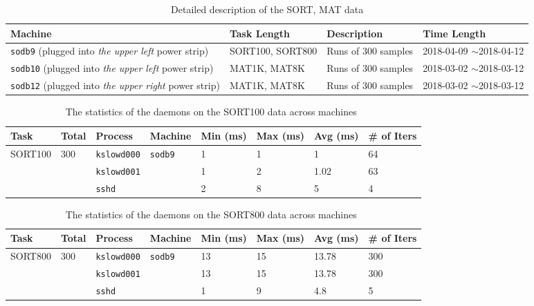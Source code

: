 \documentclass[10pt]{article}
\begin{document}
\begin{table}[h]
\begin{center}
\begin{tabular}{|p{4cm}|p{4cm}|p{4cm}|p{4cm}|} \hline
Machine & Task Length & Description & Time Length\\ \hline
{\tt sodb9}  (plugged into {\em the upper left} power strip) & SORT100, SORT800 & Runs of 300 samples & 2018-04-09 $\sim$2018-04-12\\ \hline
{\tt sodb10} (plugged into {\em the upper left} power strip)  & MAT1K, MAT8K & Runs of 300 samples & 2018-03-02 $\sim$2018-03-12 \\ \hline
{\tt sodb12} (plugged into {\em the upper right} power strip) & MAT1K, MAT8K & Runs of 300 samples & 2018-03-02 $\sim$2018-03-12 \\ \hline
\end{tabular}
\end{center}
\vspace{-.2in}
\caption{Detailed description of the SORT, MAT data\label{tab:exp_notes_sort_mat}}
\end{table}

\begin{table}[htp!]
\centering
{\small
 \begin{tabular}{|l|l|l|l|l||l|l|l|} \hline
 Task & Total & Process & Machine & Min (ms) & Max (ms) & Avg (ms) & \# of Iters\\ \hline
 SORT100 & 300 & {\tt kslowd000}  & {\tt sodb9} & 1 & 1 & 1 & 64 \\ \hline
  &  & {\tt kslowd001}  & 	& 1 & 2 & 1.02 & 63  \\ \hline
  &  & {\tt sshd}  & & 2 & 8 & 5 & 4 \\ \hline
 \end{tabular}
  }
 \caption{The statistics of the daemons on the SORT100 data across machines~\label{tab:sort100}}
\end{table}

\begin{table}[htp!]
\centering
{\small
 \begin{tabular}{|l|l|l|l|l||l|l|l|} \hline
 Task & Total & Process & Machine & Min (ms) & Max (ms) & Avg (ms) & \# of Iters\\ \hline
 SORT800 & 300 & {\tt kslowd000}  & {\tt sodb9} & 13 & 15 & 13.78 & 300 \\ \hline
  &  & {\tt kslowd001}  & 	& 13 & 15 & 13.78 & 300  \\ \hline
  &  & {\tt sshd}  & & 1 & 9 & 4.8 & 5 \\ \hline
 \end{tabular}
  }
 \caption{The statistics of the daemons on the SORT800 data across machines~\label{tab:sort800}}
\end{table}
\end{document}
